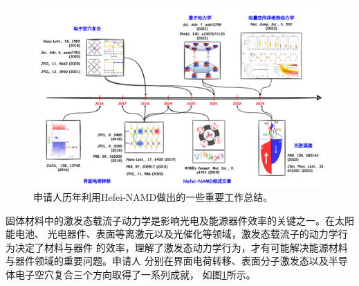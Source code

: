 \begin{figure}[ht]
  \centering
  \includegraphics[width=1.\linewidth]{figs/rep_work.pdf}
  \caption{\label{fig:fig_rep_work}
    \kaishu{}
    申请人历年利用Hefei-NAMD做出的一些重要工作总结。
  }
\end{figure}


固体材料中的激发态载流子动力学是影响光电及能源器件效率的关键之一。在太阳能电池、
光电器件、表面等离激元以及光催化等领域，激发态载流子的动力学行为决定了材料与器件
的效率，理解了激发态动力学行为，才有可能解决能源材料与器件领域的重要问题。申请人
分别在界面电荷转移、表面分子激发态以及半导体电子空穴复合三个方向取得了一系列成就，
如图\ref{fig:fig_rep_work}所示。

